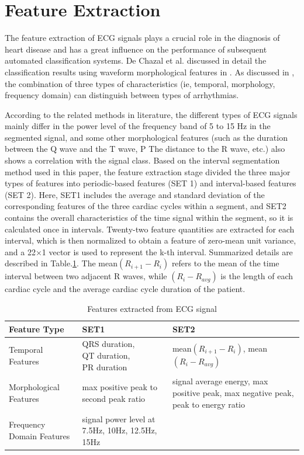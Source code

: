 \section{Feature Extraction}

The feature extraction of ECG signals plays a crucial role in the diagnosis of heart disease and has a great influence on the performance of subsequent automated classification systems. De Chazal et al. discussed in detail the classification results using waveform morphological features in \cite{autofs}. As discussed in \cite{jambukia2015classification}, the combination of three types of characteristics (ie, temporal, morphology, frequency domain) can distinguish between types of arrhythmias. 

According to the related methods in literature, the different types of ECG signals mainly differ in the power level of the frequency band of 5 to 15 Hz in the segmented signal, and some other morphological features (such as the duration between the Q wave and the T wave, P The distance to the R wave, etc.) also shows a correlation with the signal class. Based on the interval segmentation method used in this paper, the feature extraction stage divided the three major types of features into periodic-based features (SET 1) and interval-based features (SET 2). Here, SET1 includes the average and standard deviation of the corresponding features of the three cardiac cycles within a segment, and SET2 contains the overall characteristics of the time signal within the segment, so it is calculated once in intervals. Twenty-two feature quantities are extracted for each interval, which is then normalized to obtain a feature of zero-mean unit variance, and a 22×1 vector is used to represent the k-th interval. Summarized details are described in Table.\ref{table:features}. The mean$(R_{i+1}-R_i)$ refers to the mean of the time interval between two adjacent R waves, while $(R_i-R_{avg})$ is the length of each cardiac cycle and the average cardiac cycle duration of the patient. 

\begin{table}[t]
	\caption{Features extracted from ECG signal}
	\label{table:features}
	\centering
	\begin{tabular}{|m{6em} || @{}m{7.4em} ||@{} m{7.7em}|}
		\hline 
		Feature Type & SET1 & SET2 \\ 
		\hline 
		Temporal Features & QRS duration, ~~~~
		QT duration, ~~~~~~~
		PR duration & mean$(R_{i+1}-R_i)$, mean$(R_i-R_{avg})$  \\ 
		\hline 
		Morphological Features & max positive peak to second peak ratio & signal average energy, max positive peak, max
		negative
		peak, peak to
		energy ratio \\ 
		\hline 
		Frequency Domain Features & signal power level at 7.5Hz, 10Hz, 12.5Hz, 15Hz &  \\ 
		\hline 
	\end{tabular} 
\end{table}

